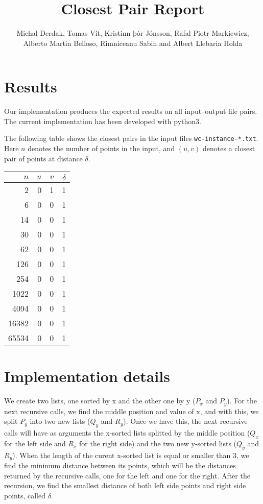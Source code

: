 \documentclass{tufte-handout}
\title{Closest Pair Report}
\author{Michal Derdak, Tomas Vit, Kristinn þór Jónsson, Rafal Piotr Markiewicz, Alberto Martin Belloso, Rimniceanu Sabin and Albert Llebaria Holda}
\begin{document}
  \maketitle

  \section{Results}

  Our implementation produces the expected results on all input--output file pairs. 
  The current implementation has been developed with python3.

  The following table shows the closest pairs in the input files {\tt wc-instance-*.txt}.
  Here $n$ denotes the number of points in the input,
  and $(u,v)$ denotes a closest pair of points at distance $\delta$.

  \bigskip\noindent
  \begin{tabular}{rrrr}\toprule
    $n$ & $u$ & $v$ & $\delta$ \\\midrule
    2 & 0 & 1 & 1 \\
    6 & 0 & 0 & 1 \\
    14 & 0 & 0 & 1 \\
    30 & 0 & 0 & 1 \\
    62 & 0 & 0 & 1 \\
    126 & 0 & 0 & 1 \\
    254 & 0 & 0 & 1 \\
    1022 & 0 & 0 & 1 \\
    4094 & 0 & 0 & 1 \\
    16382 & 0 & 0 & 1 \\
    65534 & 0 & 0 & 1 \\
  \end{tabular}


  \section{Implementation details}
  We create two lists, one sorted by x and the other one by y ($P_x$ and $P_y$).
  For the next recursive calls, we find the middle position and value of x, and with this, we split        $P_y$ into two new lists ($Q_y$ and $R_y$). Once we have this, the next recursive calls will have as arguments the x-sorted lists splitted by the middle position ($Q_x$ for the left side and $R_x$ for the right side) and the two new y-sorted lists ($Q_y$ and $R_y$). 
  When the length of the curent x-sorted list is equal or smaller than 3, we find the minimum distance between its points, which will be the distances returned by the recursive calls, one for the left and one for the right. 
  After the recursion, we find the smallest distance of both left side points and right side points, called $\delta$.  
\end{document}
